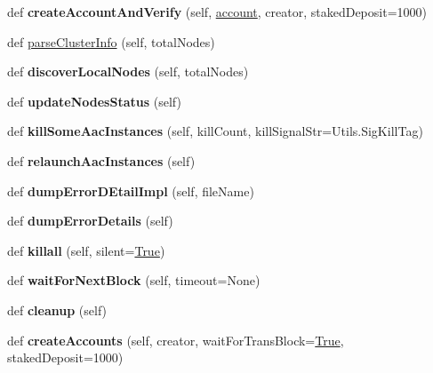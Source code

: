 \begin{DoxyCompactItemize}
\mbox{\label{classtest_utils_1_1_cluster_aa7393c84bafd2cc94c174bab334b58ee}} 
def {\bfseries create\+Account\+And\+Verify} (self, \mbox{\hyperlink{structaccount}{account}}, creator, staked\+Deposit=1000)
\item 
def \mbox{\hyperlink{classtest_utils_1_1_cluster_a687e33396d9f454532cac650058c7e63}{parse\+Cluster\+Info}} (self, total\+Nodes)
\item 
\mbox{\label{classtest_utils_1_1_cluster_a59ef7d8eead1b09abbf6c12e3811f85c}} 
def {\bfseries discover\+Local\+Nodes} (self, total\+Nodes)
\item 
\mbox{\label{classtest_utils_1_1_cluster_a5360a26b7b2a328e427fa2582b287b57}} 
def {\bfseries update\+Nodes\+Status} (self)
\item 
\mbox{\label{classtest_utils_1_1_cluster_a923d7c225912119dcb726aa42a916709}} 
def {\bfseries kill\+Some\+Aac\+Instances} (self, kill\+Count, kill\+Signal\+Str=Utils.\+Sig\+Kill\+Tag)
\item 
\mbox{\label{classtest_utils_1_1_cluster_a674765d1c7a76be520b82b8c65221dba}} 
def {\bfseries relaunch\+Aac\+Instances} (self)
\item 
\mbox{\label{classtest_utils_1_1_cluster_afe0bab47ff48c3f4cf72c2cbe5e9cf6f}} 
def {\bfseries dump\+Error\+D\+Etail\+Impl} (self, file\+Name)
\item 
\mbox{\label{classtest_utils_1_1_cluster_a1333f62527fd892748be452f5ee8db72}} 
def {\bfseries dump\+Error\+Details} (self)
\item 
\mbox{\label{classtest_utils_1_1_cluster_a4a54840146a96b411c64504ebc86e33d}} 
def {\bfseries killall} (self, silent=\mbox{\hyperlink{struct_true}{True}})
\item 
\mbox{\label{classtest_utils_1_1_cluster_a4537c0111a4828df12ef8e607126d84a}} 
def {\bfseries wait\+For\+Next\+Block} (self, timeout=None)
\item 
\mbox{\label{classtest_utils_1_1_cluster_a2a2b74285d4bc0c42de076e8d9586b55}} 
def {\bfseries cleanup} (self)
\item 
\mbox{\label{classtest_utils_1_1_cluster_a187031c3725f6cbe7fec08d4ba82ba5f}} 
def {\bfseries create\+Accounts} (self, creator, wait\+For\+Trans\+Block=\mbox{\hyperlink{struct_true}{True}}, staked\+Deposit=1000)
\end{DoxyCompactItemize}
